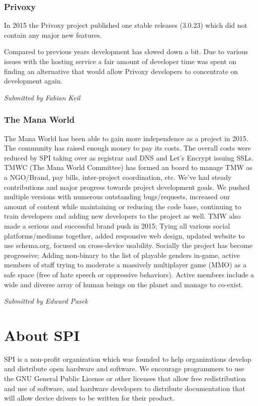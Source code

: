 \documentclass[letterpaper]{report}
\begin{document}
\subsection{Privoxy}

In 2015 the Privoxy project published one stable releases (3.0.23) which
did not contain any major new features.

Compared to previous years development has slowed down a bit.  Due to
various issues with the hosting service a fair amount of developer time
was spent on finding an alternative that would allow Privoxy developers to
concentrate on development again.

{\em Submitted by Fabian Keil}

\subsection{The Mana World}

The Mana World has been able to gain more independence as a project in
2015. The community has raised enough money to pay its costs. The overall
costs were reduced by SPI taking over as registrar and DNS and Let's
Encrypt issuing SSLs. TMWC (The Mana World Committee) has formed an board
to manage TMW as a NGO/Brand, pay bills, inter-project coordination, etc.
We've had steady contributions and major progress towards project
development goals. We pushed multiple versions with numerous outstanding
bugs/requests, increased our amount of content while maintaining or
reducing the code base, continuing to train developers and adding new
developers to the project as well. TMW also made a serious and successful
brand push in 2015; Tying all various social platforms/mediums together,
added responsive web design, updated website to use schema.org, focused on
cross-device usability. Socially the project has become progressive; Adding
non-binary to the list of playable genders in-game, active members of staff
trying to moderate a massively multiplayer game (MMO) as a safe space (free
of hate speech or oppressive behaviors). Active members include a wide and
diverse array of human beings on the planet and manage to co-exist.

{\em Submitted by Edward Pasek}


\appendix
\chapter{About SPI}

SPI is a non-profit organization which was founded to help organizations
develop and distribute open hardware and software. We encourage programmers
to use the GNU General Public License or other licenses that allow free
redistribution and use of software, and hardware developers to distribute
documentation that will allow device drivers to be written for their product.
\end{document}

